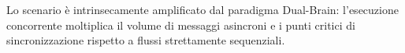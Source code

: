 \documentclass[11pt,a4paper]{article}
\begin{document}
Lo scenario è intrinsecamente amplificato dal paradigma Dual-Brain: l'esecuzione concorrente moltiplica il volume di messaggi asincroni e i punti critici di sincronizzazione rispetto a flussi strettamente sequenziali.

%
\end{document}

